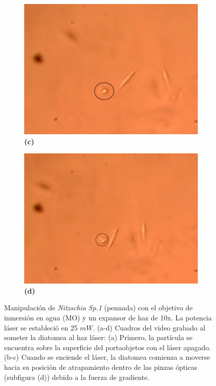 \documentclass[10pt,aspectratio=1610,compress,dvipsnames]{beamer}
\begin{document}
\begin{frame}
{\begin{figure}
  \begin{subfigure}[b]{0.2\linewidth}
    \includegraphics[width=\linewidth]{Results/Resultadosalgea2/secondalgeawater3.png} %
    \caption*{\textbf{(c)}}
    \label{fig7:c}
  \end{subfigure}\hspace{0.5cm} %
  \begin{subfigure}[b]{0.2\linewidth}
    \includegraphics[width=\linewidth]{Results/Resultadosalgea2/secondalgeawater4.png} %
    \caption*{\textbf{(d)}}
    \label{fig7:d}
  \end{subfigure}
  \caption{
Manipulación de \textit{Nitzschia Sp.1} (pennada) con el objetivo de inmersión en agua (MO) y un expansor de haz de 10x. La potencia láser se estableció en 25 $mW$. (a-d) Cuadros del video grabado al someter la diatomea al haz láser: (a) Primero, la partícula se encuentra sobre la superficie del portaobjetos con el láser apagado. (b-c) Cuando se enciende el láser, la diatomea comienza a moverse hacia su posición de atrapamiento dentro de las pinzas ópticas (subfigura (d)) debido a la fuerza de gradiente. }
  \label{poresfrustrules}
\end{figure}


}
\end{frame}
\end{document}
